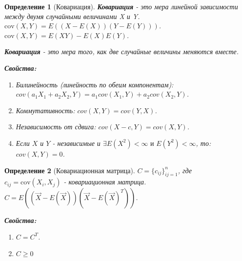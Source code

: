 \documentclass[14pt]{extarticle}
\theoremstyle{breakstyle}
\newtheorem{definition}{Определение}[subsection]
\begin{document}
\begin{definition}[Ковариация]

\textbf{Ковариация} - это мера линейной зависимости между двумя случайными величинами X и Y.\\
$\text{cov}(X,Y) = E((X - E(X))(Y - E(Y)))$.\\
$\text{cov}(X,Y) = E(XY) - E(X)E(Y)$.

\vspace{\baselineskip}

\textbf{Ковариация} - это мера того, как две случайные величины меняются вместе.

\vspace{\baselineskip}

\textbf{Свойства:}
\begin{enumerate}
    \item Билинейность (линейность по обеим компонентам): $cov(a_{1}X_{1} + a_{2}X_{2}, Y) = a_{1}cov(X_{1}, Y) + a_{2}cov(X_{2}, Y)$.
    \item Коммутативность: $cov(X, Y) = cov(Y, X)$.
    \item Независимость от сдвига: $cov(X - c, Y) = cov(X, Y)$.
    \item Если $X$ и $Y$ - независимые и $\exists E(X^{2}) < \infty \text{ и } E(Y^{2}) < \infty$, то: $cov(X, Y) = 0$.
\end{enumerate}

\end{definition}

\begin{definition}[Ковариационная матрица]

$C = \{c_{ij}\}_{ij=1}^{n}$, где $c_{ij} = \text{cov}(X_{i}, X_{j})$ - ковариационная матрица.\\
$C = E((\vec{X} - E(\vec{X}))(\vec{X} - E(\vec{X})^{T}))$.

\vspace{\baselineskip}

\textbf{Свойства:}
\begin{enumerate}
    \item $C = C^{T}$.
    \item $C \geq 0$
\end{enumerate}

\end{definition}
\end{document}
